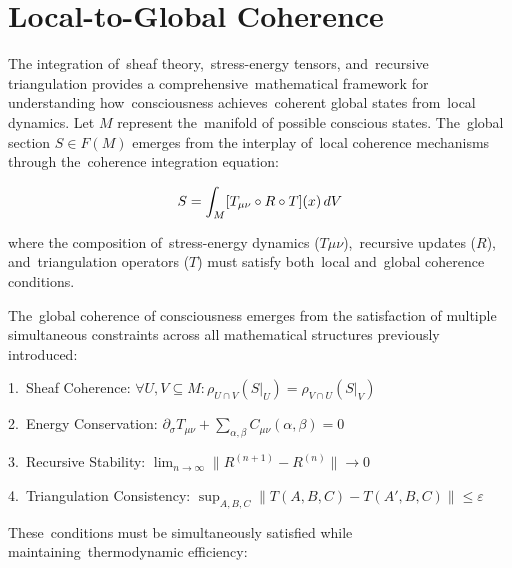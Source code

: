 \section{Local-to-Global Coherence}

The integration of~sheaf theory,~stress-energy tensors, and~recursive triangulation provides a comprehensive~mathematical framework for understanding how~consciousness achieves~coherent global states from~local dynamics. Let $M$ represent the~manifold of possible conscious states. The~global section $S \in F(M)$ emerges from the interplay of~local coherence mechanisms through the~coherence integration equation:

\begin{equation}
  S = \int_M [T_{\mu\nu} \circ R \circ T](x) \,dV
  \myequation{Coherence integration equation for conscious states}
  \label{eq:coherence_integration}
\end{equation}

where the composition of~stress-energy dynamics ($T\mu\nu$),~recursive updates ($R$), and~triangulation operators ($T$) must satisfy both~local and~global coherence conditions.

The~global coherence of consciousness emerges from the satisfaction of multiple simultaneous constraints across all mathematical structures previously introduced:

1.~Sheaf Coherence:
$\forall U,V \subseteq M: \rho_{U \cap V}(S|_U) = \rho_{V \cap U}(S|_V)$

2.~Energy Conservation:
$\partial_\sigma T_{\mu\nu} + \sum_{\alpha,\beta} C_{\mu\nu}(\alpha,\beta) = 0$

3.~Recursive Stability:
$\lim_{n \rightarrow \infty} \|R^{(n+1)} - R^{(n)}\| \rightarrow 0$

4.~Triangulation Consistency:
$\sup_{A,B,C} \|T(A,B,C) - T(A',B,C)\| \leq \varepsilon$

These~conditions must be simultaneously satisfied while maintaining~thermodynamic efficiency:


